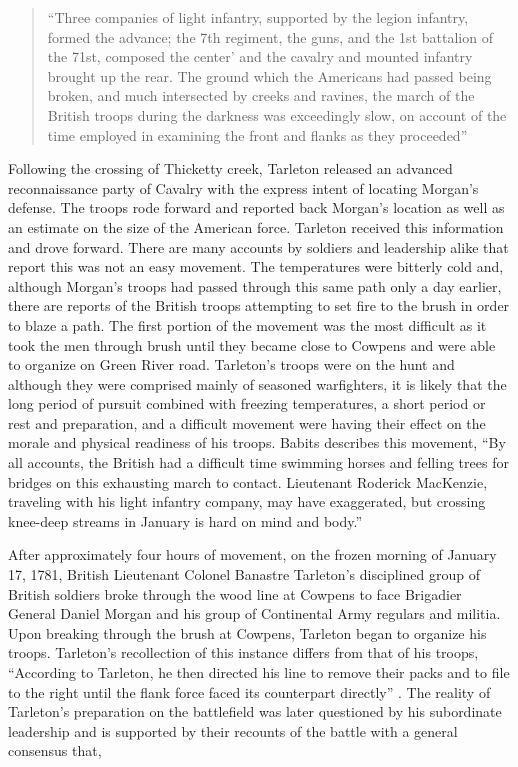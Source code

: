\begin{quote}
 “Three companies of light infantry, supported by the legion infantry, formed
 the advance; the 7th regiment, the guns, and the 1st battalion of the 71st,
 composed the center’ and the cavalry and mounted infantry brought up the rear.
 The ground which the Americans had passed being broken, and much intersected by
 creeks and ravines, the march of the British troops during the darkness was
 exceedingly slow, on account of the time employed in examining the front and
 flanks as they proceeded”
 \cite[TAB Q, 14]{rauch_battle_2007}
\end{quote}

Following the crossing of Thicketty creek, Tarleton released an advanced
reconnaissance party of Cavalry with the express intent of locating Morgan’s
defense.  The troops rode forward and reported back Morgan’s location as well as
an estimate on the size of the American force.  Tarleton received this
information and drove forward.  There are many accounts by soldiers and
leadership alike that report this was not an easy movement.  The temperatures
were bitterly cold and, although Morgan's troops had passed through this same
path only a day earlier, there are reports of the British troops attempting to
set fire to the brush in order to blaze a path.   The first portion of the
movement was the most difficult as it took the men through brush until they
became close to Cowpens and were able to organize on Green River road.
Tarleton’s troops were on the hunt and although they were comprised mainly of
seasoned warfighters, it is likely that the long period of pursuit combined with
freezing temperatures, a short period or rest and preparation, and a difficult
movement were having their effect on the morale and physical readiness of his
troops.  Babits describes this movement, “By all accounts, the British had a
difficult time swimming horses and felling trees for bridges on this exhausting
march to contact.  Lieutenant Roderick MacKenzie, traveling with his light
infantry company, may have exaggerated, but crossing knee-deep streams in
January is hard on mind and body.” \cite[57]{babits_devil_2001}

After approximately four hours of movement, on the frozen morning of January 17,
1781, British Lieutenant Colonel Banastre Tarleton's disciplined group of
British soldiers broke through the wood line at Cowpens to face Brigadier
General Daniel Morgan and his group of Continental Army regulars and militia.
Upon breaking through the brush at Cowpens, Tarleton began to organize his
troops.  Tarleton’s recollection of this instance differs from that of his
troops, “According to Tarleton, he then directed his line to remove their packs
and to file to the right until the flank force faced its counterpart directly”
\cite[p.51]{moncure_cowpens_1996}.  The reality of Tarleton’s preparation on the battlefield was
later questioned by his subordinate leadership and is supported by their
recounts of the battle with a general consensus that,

